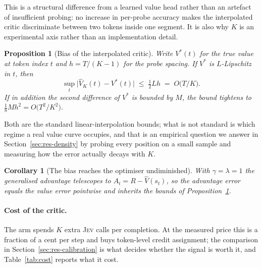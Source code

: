 \documentclass[11pt]{article}
\newtheorem{proposition}{Proposition}
\newtheorem{corollary}{Corollary}
\newcommand{\jev}{\textsc{Jev}}
\begin{document}
This is a structural difference from a learned value head rather than an
artefact of insufficient probing: no increase in per-probe accuracy makes the
interpolated critic discriminate between two tokens inside one segment. It is
also why $K$ is an experimental axis rather than an implementation detail.

\begin{proposition}[Bias of the interpolated critic]
\label{prop:bias}
Write $V^\ast(t)$ for the true value at token index $t$ and $h = T/(K-1)$ for
the probe spacing. If $V^\ast$ is $L$-Lipschitz in $t$, then
\[
\sup_t \big| \hat V_K(t) - V^\ast(t) \big| \;\le\; \tfrac{1}{2} L h
\;=\; O\!\big(T/K\big).
\]
If in addition the second difference of $V^\ast$ is bounded by $M$, the bound
tightens to $\tfrac{1}{8} M h^2 = O\!\big(T^2/K^2\big).$
\end{proposition}

Both are the standard linear-interpolation bounds; what is not standard is
which regime a real value curve occupies, and that is an empirical question we
answer in Section~\ref{sec:res-density} by probing every position on a small
sample and measuring how the error actually decays with $K$.

\begin{corollary}[The bias reaches the optimiser undiminished]
\label{cor:adv}
With $\gamma = \lambda = 1$ the generalised advantage telescopes to
$A_t = R - \hat V(s_t)$, so the advantage error equals the value error
pointwise and inherits the bounds of Proposition~\ref{prop:bias}.
\end{corollary}

\paragraph{Cost of the critic.} The arm spends $K$ extra \jev{} calls per
completion. At the measured price this is a fraction of a cent per step and
buys token-level credit assignment; the comparison in
Section~\ref{sec:res-calibration} is what decides whether the signal is worth
it, and Table~\ref{tab:cost} reports what it cost.
\end{document}
